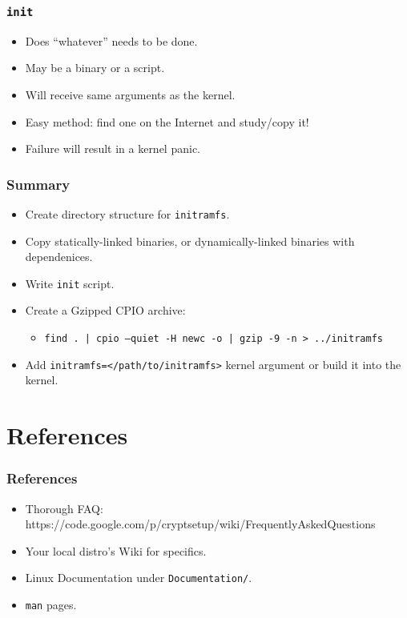 \documentclass[xcolor={dvipsnames,svgnames},hyperref=dvips]{beamer}
\begin{document}
	\begin{frame}
		\frametitle{\texttt{init}}
		\begin{itemize}
		\item Does ``whatever'' needs to be done.
		\item May be a binary or a script.
		\item Will receive same arguments as the kernel.
		\item Easy method: find one on the Internet and study/copy it!
		\item Failure will result in a kernel panic.
		\end{itemize}
	\end{frame}

	\begin{frame}
		\frametitle{Summary}
		\begin{itemize}
		\item Create directory structure for \texttt{initramfs}.
		\item Copy statically-linked binaries, or dynamically-linked binaries with dependenices.
		\item Write \texttt{init} script.
		\item Create a Gzipped CPIO archive:
			\begin{itemize}
			\item \texttt{find . | cpio --quiet -H newc -o | gzip -9 -n > ../initramfs}
			\end{itemize}
		\item Add \texttt{initramfs=</path/to/initramfs>} kernel argument or build it into the kernel.
		\end{itemize}
	\end{frame}


\section{References}
\begin{frame}
	\frametitle{References}
	\begin{itemize}
	\item Thorough FAQ: https://code.google.com/p/cryptsetup/wiki/FrequentlyAskedQuestions
	\item Your local distro's Wiki for specifics.
	\item Linux Documentation under \texttt{Documentation/}.
	\item \texttt{man} pages.
	\end{itemize}
\end{frame}
\end{document}
